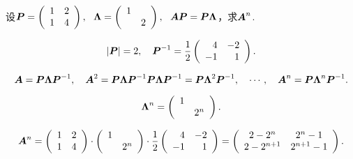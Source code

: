 \begin{li}
  设$\boldsymbol{P} = \left(
    \begin{array}{cc}
      1 & 2\\
      1 & 4
    \end{array}
  \right), ~~ \boldsymbol{\Lambda}=\left(
    \begin{array}{cc}
      1 & \\
        & 2
    \end{array}
  \right), ~~ \boldsymbol{A}\boldsymbol{P}=\boldsymbol{P}\boldsymbol{\Lambda}$，求$\boldsymbol{A}^n$.
\end{li}
\begin{jie}
$$
|\boldsymbol{P}|=2, \quad \boldsymbol{P}^{-1} = \frac12 \left(
  \begin{array}{rr}
    4 & -2\\
    -1 & 1
  \end{array}
\right).
$$

$$
\boldsymbol{A} = \boldsymbol{P}\boldsymbol{\Lambda}\boldsymbol{P}^{-1}, \quad 
\boldsymbol{A}^2 = \boldsymbol{P}\boldsymbol{\Lambda}\boldsymbol{P}^{-1}\boldsymbol{P}\boldsymbol{\Lambda}\boldsymbol{P}^{-1} = \boldsymbol{P}\boldsymbol{\Lambda}^2\boldsymbol{P}^{-1}, \quad 
\cdots, \quad 
\boldsymbol{A}^n = \boldsymbol{P}\boldsymbol{\Lambda}^n\boldsymbol{P}^{-1}.
$$

$$
\boldsymbol{\Lambda}^n = \left(
  \begin{array}{cc}
    1 & \\
      & 2^n
  \end{array}
\right).
$$

$$
\boldsymbol{A}^n =  \left(
  \begin{array}{cc}
    1 & 2\\
    1 & 4
  \end{array}
\right) \cdot \left(
  \begin{array}{cc}
    1 & \\
      & 2^n
  \end{array}
\right) \cdot \frac12 \left(
  \begin{array}{rr}
    4 & -2\\
    -1 & 1
  \end{array}
\right) = \left(
  \begin{array}{cc}
    2-2^n & 2^n-1\\
    2-2^{n+1} & 2^{n+1}-1
  \end{array}
\right).
$$

\end{jie}




